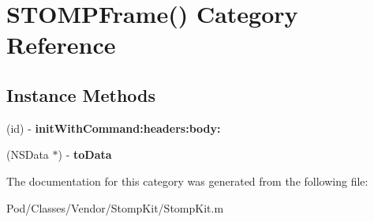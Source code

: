 \hypertarget{category_s_t_o_m_p_frame_07_08}{}\section{S\+T\+O\+M\+P\+Frame() Category Reference}
\label{category_s_t_o_m_p_frame_07_08}
\subsection*{Instance Methods}
\begin{DoxyCompactItemize}
\item 
(id) -\/ {\bfseries init\+With\+Command\+:headers\+:body\+:}\hypertarget{category_s_t_o_m_p_frame_07_08_ac3797c481672e7d0cc4b20af17c79e17}{}\label{category_s_t_o_m_p_frame_07_08_ac3797c481672e7d0cc4b20af17c79e17}

\item 
(N\+S\+Data $\ast$) -\/ {\bfseries to\+Data}\hypertarget{category_s_t_o_m_p_frame_07_08_ac126a2c7430aaa3ea0fe883b94213531}{}\label{category_s_t_o_m_p_frame_07_08_ac126a2c7430aaa3ea0fe883b94213531}

\end{DoxyCompactItemize}


The documentation for this category was generated from the following file\+:\begin{DoxyCompactItemize}
\item 
Pod/\+Classes/\+Vendor/\+Stomp\+Kit/Stomp\+Kit.\+m\end{DoxyCompactItemize}
